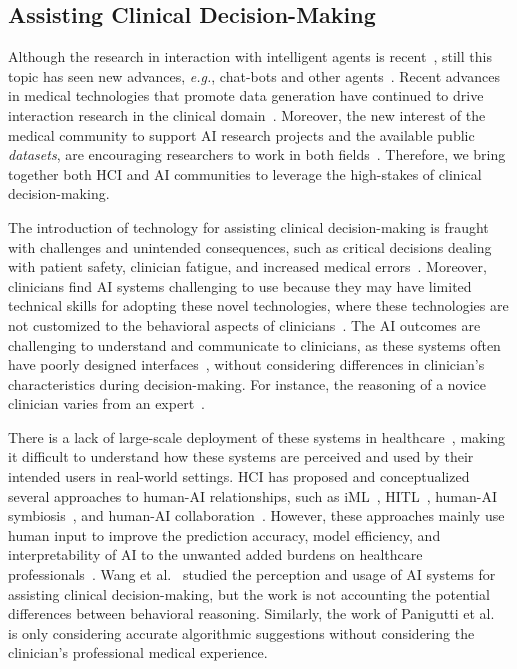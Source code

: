\subsection{Assisting Clinical Decision-Making}
\label{sec:app005003002}

Although the research in interaction with intelligent agents is recent~\cite{burr2018analysis}, still this topic has seen new advances, {\it e.g.}, chat-bots and other agents~\cite{miller2019intrinsically}.
Recent advances in medical technologies that promote data generation have continued to drive interaction research in the clinical domain~\cite{azuaje2019artificial, Lopes:2017:UHC:3143820.3144118}.
Moreover, the new interest of the medical community to support \ac{AI} research projects and the available public {\it datasets}, are encouraging researchers to work in both fields~\cite{lau2018dataset}.
Therefore, we bring together both \ac{HCI} and \ac{AI} communities to leverage the high-stakes of clinical decision-making.

The introduction of technology for assisting clinical decision-making is fraught with challenges and unintended consequences, such as critical decisions dealing with patient safety, clinician fatigue, and increased medical errors~\cite{10.1093/jamia/ocab291, 10.1117/12.2613082, doi:10.1148/radiol.212631}.
Moreover, clinicians find \ac{AI} systems challenging to use because they may have limited technical skills for adopting these novel technologies, where these technologies are not customized to the behavioral aspects of clinicians~\cite{CALISTO2022102922}.
The \ac{AI} outcomes are challenging to understand and communicate to clinicians, as these systems often have poorly designed interfaces~\cite{10.1145/3555157}, without considering differences in clinician's characteristics during decision-making.
For instance, the reasoning of a novice clinician varies from an expert~\cite{Edgar2022}.

There is a lack of large-scale deployment of these systems in healthcare~\cite{10.1145/3411764.3445432, SU202328, ZAPPATORE20231}, making it difficult to understand how these systems are perceived and used by their intended users in real-world settings.
\ac{HCI} has proposed and conceptualized several approaches to human-AI relationships, such as \ac{iML}~\cite{10.1145/604045.604056}, \ac{HITL}~\cite{holzinger2016interactive, 10.1145/3397481.3450668}, human-\ac{AI} symbiosis~\cite{JARRAHI2018577}, and human-\ac{AI} collaboration~\cite{10.1145/3411764.3445432}.
However, these approaches mainly use human input to improve the prediction accuracy, model efficiency, and interpretability of \ac{AI} to the unwanted added burdens on healthcare professionals~\cite{10.1145/3555157, 10.1145/3209889.3209897}.
Wang et al.~\cite{10.1145/3411764.3445432} studied the perception and usage of \ac{AI} systems for assisting clinical decision-making, but the work is not accounting the potential differences between behavioral reasoning.
Similarly, the work of Panigutti et al.~\cite{10.1145/3491102.3502104} is only considering accurate algorithmic suggestions without considering the clinician's professional medical experience.


